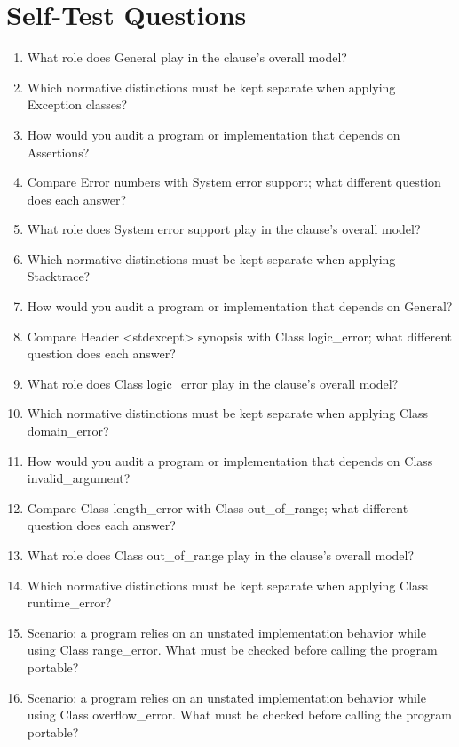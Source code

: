 \documentclass[11pt,letterpaper]{article}
\begin{document}
\section{Self-Test Questions}
\begin{enumerate}
\item What role does General play in the clause's overall model?
\item Which normative distinctions must be kept separate when applying Exception classes?
\item How would you audit a program or implementation that depends on Assertions?
\item Compare Error numbers with System error support; what different question does each answer?
\item What role does System error support play in the clause's overall model?
\item Which normative distinctions must be kept separate when applying Stacktrace?
\item How would you audit a program or implementation that depends on General?
\item Compare Header <stdexcept> synopsis with Class logic\_\allowbreak{}error; what different question does each answer?
\item What role does Class logic\_\allowbreak{}error play in the clause's overall model?
\item Which normative distinctions must be kept separate when applying Class domain\_\allowbreak{}error?
\item How would you audit a program or implementation that depends on Class invalid\_\allowbreak{}argument?
\item Compare Class length\_\allowbreak{}error with Class out\_\allowbreak{}of\_\allowbreak{}range; what different question does each answer?
\item What role does Class out\_\allowbreak{}of\_\allowbreak{}range play in the clause's overall model?
\item Which normative distinctions must be kept separate when applying Class runtime\_\allowbreak{}error?
\item Scenario: a program relies on an unstated implementation behavior while using Class range\_\allowbreak{}error. What must be checked before calling the program portable?
\item Scenario: a program relies on an unstated implementation behavior while using Class overflow\_\allowbreak{}error. What must be checked before calling the program portable?
\end{enumerate}
\end{document}

